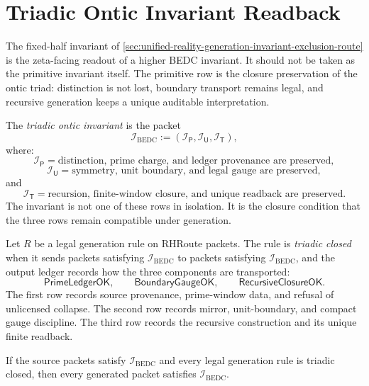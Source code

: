 \section{Triadic Ontic Invariant Readback}
\label{sec:unified-reality-triadic-ontic-invariant-readback}

The fixed-half invariant of
\autoref{sec:unified-reality-generation-invariant-exclusion-route} is
the zeta-facing readout of a higher BEDC invariant.  It should not be
taken as the primitive invariant itself.  The primitive row is the
closure preservation of the ontic triad: distinction is not lost,
boundary transport remains legal, and recursive generation keeps a
unique auditable interpretation.

\begin{definition}
\label{def:unified-reality-triadic-ontic-invariant}
The \emph{triadic ontic invariant} is the packet
$$
\mathcal I_{\mathrm{BEDC}}
:=
\left(
\mathcal I_{\mathsf P},
\mathcal I_{\mathsf U},
\mathcal I_{\mathsf T}
\right),
$$
where:
$$
\mathcal I_{\mathsf P}
=
\text{distinction, prime charge, and ledger provenance are preserved},
$$
$$
\mathcal I_{\mathsf U}
=
\text{symmetry, unit boundary, and legal gauge are preserved},
$$
and
$$
\mathcal I_{\mathsf T}
=
\text{recursion, finite-window closure, and unique readback are preserved}.
$$
The invariant is not one of these rows in isolation.  It is the closure
condition that the three rows remain compatible under generation.
\end{definition}

\begin{definition}
\label{def:unified-reality-triadic-closed-generation-rule}
Let $R$ be a legal generation rule on RHRoute packets.  The rule is
\emph{triadic closed} when it sends packets satisfying
$\mathcal I_{\mathrm{BEDC}}$ to packets satisfying
$\mathcal I_{\mathrm{BEDC}}$, and the output ledger records how the
three components are transported:
$$
\mathsf{PrimeLedgerOK},
\qquad
\mathsf{BoundaryGaugeOK},
\qquad
\mathsf{RecursiveClosureOK}.
$$
The first row records source provenance, prime-window data, and refusal
of unlicensed collapse.  The second row records mirror, unit-boundary,
and compact gauge discipline.  The third row records the recursive
construction and its unique finite readback.
\end{definition}

\begin{theorem}
\label{thm:unified-reality-triadic-closure-preserved-by-generated-packets}
If the source packets satisfy $\mathcal I_{\mathrm{BEDC}}$ and every
legal generation rule is triadic closed, then every generated packet
satisfies $\mathcal I_{\mathrm{BEDC}}$.
\end{theorem}

